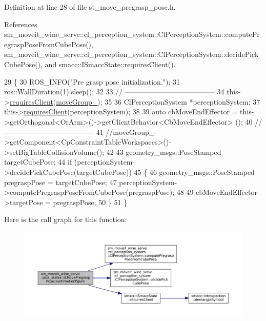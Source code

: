 Definition at line 28 of file st\+\_\+move\+\_\+pregrasp\+\_\+pose.\+h.



References sm\+\_\+moveit\+\_\+wine\+\_\+serve\+::cl\+\_\+perception\+\_\+system\+::\+Cl\+Perception\+System\+::compute\+Pregrasp\+Pose\+From\+Cube\+Pose(), sm\+\_\+moveit\+\_\+wine\+\_\+serve\+::cl\+\_\+perception\+\_\+system\+::\+Cl\+Perception\+System\+::decide\+Pick\+Cube\+Pose(), and smacc\+::\+I\+Smacc\+State\+::requires\+Client().


\begin{DoxyCode}
29             \{
30                 ROS\_INFO(\textcolor{stringliteral}{"Pre grasp pose initialization."});
31                 ros::WallDuration(1).sleep();
32 
33                 \textcolor{comment}{// --------------------------------------}
34                 this->\hyperlink{classsmacc_1_1ISmaccState_a7f95c9f0a6ea2d6f18d1aec0519de4ac}{requiresClient}(\hyperlink{structsm__moveit__wine__serve_1_1pick__states_1_1StMovePregraspPose_ad72ffc3afc60fbec1214d1e4cc14bab9}{moveGroup\_});
35                 
36                 ClPerceptionSystem *perceptionSystem;
37                 this->\hyperlink{classsmacc_1_1ISmaccState_a7f95c9f0a6ea2d6f18d1aec0519de4ac}{requiresClient}(perceptionSystem);
38 
39                 \textcolor{keyword}{auto} cbMoveEndEffector = this->getOrthogonal<OrArm>()->getClientBehavior<CbMoveEndEffector>
      ();
40                 \textcolor{comment}{// --------------------------------------}
41                 \textcolor{comment}{//moveGroup\_->getComponent<CpConstraintTableWorkspaces>()->setBigTableCollisionVolume();}
42 
43                 geometry\_msgs::PoseStamped targetCubePose;
44                 \textcolor{keywordflow}{if} (perceptionSystem->decidePickCubePose(targetCubePose))
45                 \{
46                     geometry\_msgs::PoseStamped pregraspPose = targetCubePose;
47                     perceptionSystem->computePregraspPoseFromCubePose(pregraspPose);
48 
49                     cbMoveEndEffector->targetPose = pregraspPose;
50                 \}
51             \}
\end{DoxyCode}
Here is the call graph for this function\+:
\nopagebreak
\begin{figure}[H]
\begin{center}
\leavevmode
\includegraphics[width=350pt]{structsm__moveit__wine__serve_1_1pick__states_1_1StMovePregraspPose_a9dc0fd16ec45943f8d66c3f29dc7b082_cgraph}
\end{center}
\end{figure}
